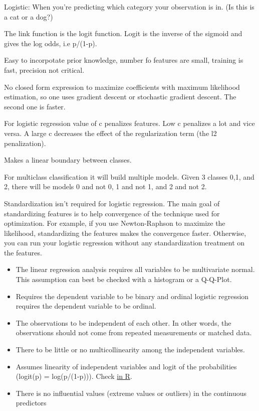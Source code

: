 \documentclass[]{book}
\begin{document}
Logistic: When you're predicting which category your observation is in. (Is this is a cat or a dog?)

The link function is the logit function. Logit is the inverse of the sigmoid and gives the log odds, i.e p/(1-p).

Easy to incorpotate prior knowledge, number fo features are small, training is fast, precision not critical.

No closed form expression to maximize coefficients with maximum likelihood estimation, so one uses gradient descent or stochastic gradient descent. The second one is faster.

For logistic regression value of c penalizes features. Low c penalizes a lot and vice versa. A large c decreases the effect of the regularization term (the l2 penalization).

Makes a linear boundary between classes.

For multiclass classification it will build multiple models. Given 3 classes 0,1, and 2, there will be models 0 and not 0, 1 and not 1, and 2 and not 2.

Standardization isn't required for logistic regression. The main goal of standardizing features is to help convergence of the technique used for optimization. For example, if you use Newton-Raphson to maximize the likelihood, standardizing the features makes the convergence faster. Otherwise, you can run your logistic regression without any standardization treatment on the features.

\begin{itemize}
\item
  The linear regression analysis requires all variables to be multivariate normal. This assumption can best be checked with a histogram or a Q-Q-Plot.
\item
  Requires the dependent variable to be binary and ordinal logistic regression requires the dependent variable to be ordinal.
\item
  The observations to be independent of each other. In other words, the observations should not come from repeated measurements or matched data.
\item
  There to be little or no multicollinearity among the independent variables.
\item
  Assumes linearity of independent variables and logit of the probabilities (logit(p) = log(p/(1-p))). Check \href{https://stats.stackexchange.com/questions/169348/how-should-i-check-the-assumption-of-linearity-to-the-logit-for-the-continuous-i}{in R}.
\item
  There is no influential values (extreme values or outliers) in the continuous predictors
\end{itemize}
\end{document}
